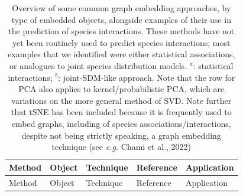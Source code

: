 \documentclass[10pt,oneside]{article}
\begin{document}
\hypertarget{tbl:methods}{}
\begin{longtable}[]{@{}lllll@{}}
\caption{\label{tbl:methods}Overview of some common graph embedding
approaches, by type of embedded objects, alongside examples of their use
in the prediction of species interactions. These methods have not yet
been routinely used to predict species interactions; most examples that
we identified were either statistical associations, or analogues to
joint species distribution models. \(^a\): statistical interactions;
\(^b\): joint-SDM-like approach. Note that the row for PCA also applies
to kernel/probabilistic PCA, which are variations on the more general
method of SVD. Note further that tSNE has been included because it is
frequently used to embed graphs, including of species
associations/interactions, despite not being strictly speaking, a graph
embedding technique (see \emph{e.g.} Chami et al., 2022)}\tabularnewline
\toprule
\begin{minipage}[b]{0.09\columnwidth}\raggedright
Method\strut
\end{minipage} & \begin{minipage}[b]{0.11\columnwidth}\raggedright
Object\strut
\end{minipage} & \begin{minipage}[b]{0.23\columnwidth}\raggedright
Technique\strut
\end{minipage} & \begin{minipage}[b]{0.14\columnwidth}\raggedright
Reference\strut
\end{minipage} & \begin{minipage}[b]{0.29\columnwidth}\raggedright
Application\strut
\end{minipage}\tabularnewline
\midrule
\endfirsthead
\toprule
\begin{minipage}[b]{0.09\columnwidth}\raggedright
Method\strut
\end{minipage} & \begin{minipage}[b]{0.11\columnwidth}\raggedright
Object\strut
\end{minipage} & \begin{minipage}[b]{0.23\columnwidth}\raggedright
Technique\strut
\end{minipage} & \begin{minipage}[b]{0.14\columnwidth}\raggedright
Reference\strut
\end{minipage} & \begin{minipage}[b]{0.29\columnwidth}\raggedright
Application\strut
\end{minipage}\tabularnewline

\end{longtable}
\end{document}
